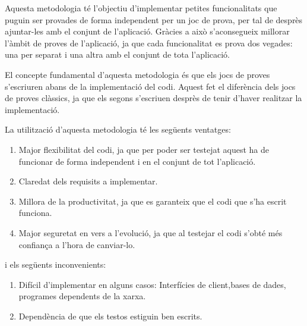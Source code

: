 Aquesta metodologia té l'objectiu d'implementar petites funcionalitats que puguin ser provades de forma independent per un joc de prova, per tal de desprès ajuntar-les amb el conjunt de l'aplicació. Gràcies a això s'aconsegueix millorar l'àmbit de proves de l'aplicació, ja que cada funcionalitat es prova dos vegades: una per separat i una altra amb el conjunt de tota l'aplicació. 

El concepte fundamental d'aquesta metodologia és que els jocs de proves s'escriuren abans de la implementació del codi. Aquest fet el diferència dels jocs de proves clàssics, ja que els segons s'escriuen desprès de tenir d'haver realitzar la implementació.

La utilització d'aquesta metodologia té les següents ventatges: 

\begin{enumerate}
    \item{Major flexibilitat del codi, ja que per poder ser testejat aquest ha de funcionar de forma independent i en el conjunt de tot l'aplicació.}
    \item{Claredat dels requisits a implementar.}
    \item{Millora de la productivitat, ja que es garanteix que el codi que s'ha escrit funciona.}
    \item{Major seguretat en vers a l'evolució, ja que al testejar el codi s'obté més confiança a l'hora de canviar-lo.}
\end{enumerate}

i els següents inconvenients: 

\begin{enumerate}
    \item{Difícil d'implementar en alguns casos: Interfícies de client,bases de dades, programes dependents de la xarxa.}
    \item{Dependència de que els testos estiguin ben escrits. }
\end{enumerate}

